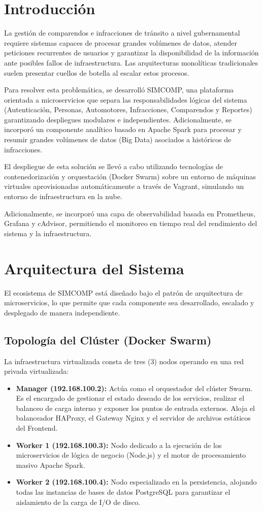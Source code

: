 \documentclass[conference]{IEEEtran}
\begin{document}
\section{Introducción}
La gestión de comparendos e infracciones de tránsito a nivel gubernamental requiere sistemas capaces de procesar grandes volúmenes de datos, atender peticiones recurrentes de usuarios y garantizar la disponibilidad de la información ante posibles fallos de infraestructura. Las arquitecturas monolíticas tradicionales suelen presentar cuellos de botella al escalar estos procesos. 

Para resolver esta problemática, se desarrolló SIMCOMP, una plataforma orientada a microservicios que separa las responsabilidades lógicas del sistema (Autenticación, Personas, Automotores, Infracciones, Comparendos y Reportes) garantizando despliegues modulares e independientes. Adicionalmente, se incorporó un componente analítico basado en Apache Spark para procesar y resumir grandes volúmenes de datos (Big Data) asociados a históricos de infracciones.

El despliegue de esta solución se llevó a cabo utilizando tecnologías de contenedorización y orquestación (Docker Swarm) sobre un entorno de máquinas virtuales aprovisionadas automáticamente a través de Vagrant, simulando un entorno de infraestructura en la nube.

Adicionalmente, se incorporó una capa de observabilidad basada en Prometheus, Grafana y cAdvisor, permitiendo el monitoreo en tiempo real del rendimiento del sistema y la infraestructura.

\section{Arquitectura del Sistema}

El ecosistema de SIMCOMP está diseñado bajo el patrón de arquitectura de microservicios, lo que permite que cada componente sea desarrollado, escalado y desplegado de manera independiente.

\subsection{Topología del Clúster (Docker Swarm)}
La infraestructura virtualizada consta de tres (3) nodos operando en una red privada virtualizada:
\begin{itemize}
    \item \textbf{Manager (192.168.100.2):} Actúa como el orquestador del clúster Swarm. Es el encargado de gestionar el estado deseado de los servicios, realizar el balanceo de carga interno y exponer los puntos de entrada externos. Aloja el balanceador HAProxy, el Gateway Nginx y el servidor de archivos estáticos del Frontend.
    \item \textbf{Worker 1 (192.168.100.3):} Nodo dedicado a la ejecución de los microservicios de lógica de negocio (Node.js) y el motor de procesamiento masivo Apache Spark.
    \item \textbf{Worker 2 (192.168.100.4):} Nodo especializado en la persistencia, alojando todas las instancias de bases de datos PostgreSQL para garantizar el aislamiento de la carga de I/O de disco.
\end{itemize}
\end{document}
